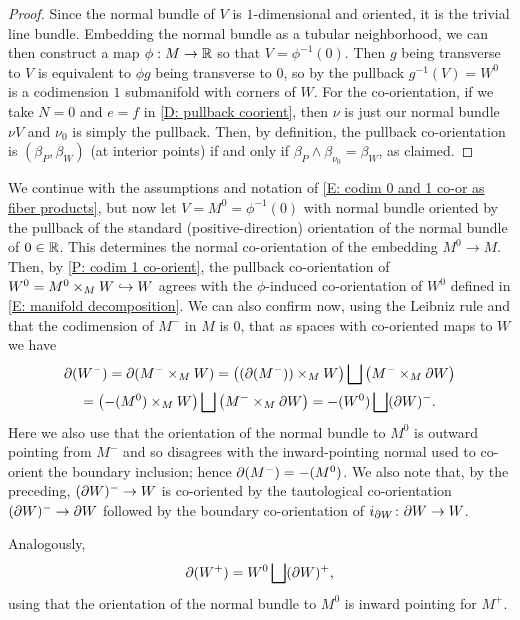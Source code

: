 \begin{proof}
	Since the normal bundle of $V$ is $1$-dimensional and oriented, it is the trivial line bundle.
	Embedding the normal bundle as a tubular neighborhood, we can then construct a map $\phi: M \to \mathbb{R}$ so that $V = \phi^{-1}(0)$.
	Then $g$ being transverse to $V$ is equivalent to $\phi g$ being transverse to $0$, so by \cite[Proposition 4.2.9]{MaDo92} the pullback $g^{-1}(V) = W^0$ is a codimension $1$ submanifold with corners of $W$.
	For the co-orientation, if we take $N = 0$ and $e = f$ in \cref{D: pullback coorient}, then $\nu$ is just our normal bundle $\nu V$ and $\nu_0$ is simply the pullback.
	Then, by definition, the pullback co-orientation is $(\beta_P, \beta_W)$ (at interior points) if and only if $\beta_P \wedge \beta_{\nu_0} = \beta_W$, as claimed.
\end{proof}

\begin{example}\label{E: codim 1 pullbacks}
	We continue with the assumptions and notation of \cref{E: codim 0 and 1 co-or as fiber products}, but now let $V = M^0 = \phi^{-1}(0)$ with normal bundle oriented by the pullback of the standard (positive-direction) orientation of the normal bundle of $0 \in \mathbb{R}$.
	This determines the normal co-orientation of the embedding $M^0 \to M$.
	Then, by \cref{P: codim 1 co-orient}, the pullback co-orientation of $W^0 = M^0 \times_M W \hookrightarrow W$ agrees with the $\phi$-induced co-orientation of $W^0$ defined in \cref{E: manifold decomposition}.
	We can also confirm now, using the Leibniz rule and that the codimension of $M^-$ in $M$ is $0$, that as spaces with co-oriented maps to $W$ we have
	\begin{multline*}
		\partial(W^-) = \partial(M^- \times_M W) = \left( (\partial (M^-)) \times_M W \right) \bigsqcup \left( M^- \times_M \partial W \right)\\
		= \left( -(M^0) \times_M W \right) \bigsqcup \left( M^- \times_M \partial W \right)= -(W^0) \bigsqcup (\partial W)^-.
	\end{multline*}
	Here we also use that the orientation of the normal bundle to $M^0$ is outward pointing from $M^-$ and so disagrees with the inward-pointing normal used to co-orient the boundary inclusion; hence $\partial(M^-) = -(M^0)$.
	We also note that, by the preceding, $(\partial W)^- \to W$ is co-oriented by the tautological co-orientation $(\partial W)^- \to \partial W$ followed by the boundary co-orientation of $i_{\partial W} \colon \partial W \to W$.

	Analogously,
	$$\partial (W^+) = W^0 \bigsqcup (\partial W)^+,$$
	using that the orientation of the normal bundle to $M^0$ is inward pointing for $M^+$.
\end{example}

